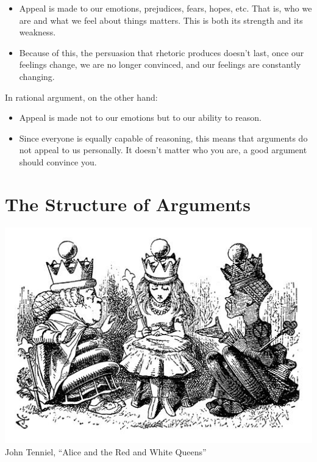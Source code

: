 \documentclass[justified]{tufte-book}
\begin{document}
\begin{itemize}
\item
  Appeal is made to our emotions, prejudices, fears, hopes, etc. That is, who we are and what we feel about things matters. This is both its strength and its weakness.
\item
  Because of this, the persuasion that rhetoric produces doesn't last, once our feelings change, we are no longer convinced, and our feelings are constantly changing.
\end{itemize}

In rational argument, on the other hand:

\begin{itemize}
\item
  Appeal is made not to our emotions but to our ability to reason.
\item
  Since everyone is equally capable of reasoning, this means that arguments do not appeal to us personally. It doesn't matter who you are, a good argument should convince you.
\end{itemize}

\hypertarget{the-structure-of-arguments}{%
\section{The Structure of Arguments}\label{the-structure-of-arguments}}

\begin{marginfigure}
\includegraphics{img/tenniel-alice-queens.jpg} John Tenniel, ``Alice and
the Red and White Queens''
\end{marginfigure}
\end{document}
